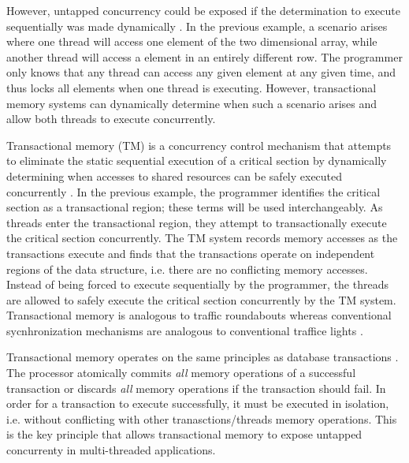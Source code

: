 \documentclass[a4paper]{article}
\begin{document}
\indent
However, untapped concurrency could be exposed if the determination to execute
sequentially was made dynamically \cite{intel_prog_ref}.  In the previous
example, a scenario arises where one thread will access one element of the two
dimensional array, while another thread will access a element in an entirely
different row.  The programmer only knows that any thread can access any given
element at any given time, and thus locks all elements when one thread is executing.
However, transactional memory systems can dynamically determine when such a
scenario arises and allow both threads to execute concurrently.
\par

\indent
Transactional memory (TM) is a concurrency control mechanism that attempts to
eliminate the static sequential execution of a critical section by dynamically
determining when accesses to shared resources can be safely executed
concurrently \cite{sle_rajwar}.  In the previous example, the programmer
identifies the critical section as a transactional region; these terms will be
used interchangeably.  As threads enter the transactional region, they attempt
to transactionally execute the critical section concurrently.  The TM system
records memory accesses as the transactions execute and finds that the
transactions operate on independent regions of the data structure, i.e. there
are no conflicting memory accesses.  Instead of being forced to execute
sequentially by the programmer, the threads are allowed to safely execute the
critical section concurrently by the TM system.  Transactional memory is
analogous to traffic roundabouts whereas conventional sycnhronization mechanisms
are analogous to conventional traffice lights \cite{neuling_vid}.
\par

\indent 
Transactional memory operates on the same principles as database
transactions \cite{tm_2nd}.  The processor atomically commits \textit{all}
memory operations of a successful transaction or discards \textit{all} memory
operations if the transaction should fail.  In order for a transaction to execute
successfully, it must be executed in isolation, i.e. without conflicting with
other tranasctions/threads memory operations.  This is the key principle that
allows transactional memory to expose untapped concurrenty in multi-threaded
applications.
\par 
\end{document}
